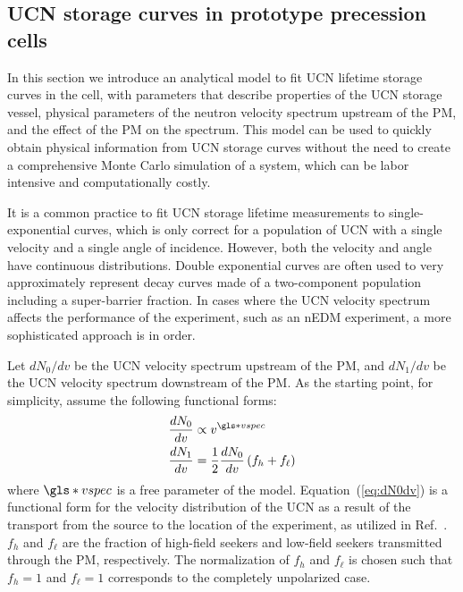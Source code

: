 
\subsection{\label{subsec:storageCurves}UCN storage curves in prototype precession cells}


In this section we introduce an analytical model to fit UCN lifetime storage curves in the cell, with parameters that describe properties of the UCN storage vessel, physical parameters of the neutron velocity spectrum upstream of the PM, and the effect of the PM on the spectrum. This model can be used to quickly obtain physical information from UCN storage curves without the need to create a comprehensive Monte Carlo simulation of a system, which can be labor intensive and computationally costly.

It is a common practice to fit UCN storage lifetime measurements to single-exponential curves, which is only correct for a population of UCN with a single velocity and a single angle of incidence. However, both the velocity and angle have continuous distributions. Double exponential curves are often used to very approximately represent decay curves made of a two-component population including a super-barrier fraction. In cases where the UCN velocity spectrum affects the performance of the experiment, such as an nEDM experiment, a more sophisticated approach is in order. 

Let $dN_0/dv$ be the UCN velocity spectrum upstream of the PM, and $dN_1/dv$ be the UCN velocity spectrum downstream of the PM. As the starting point, for simplicity, assume the following functional forms:
%
\begin{align}
    \frac{dN_0}{dv} &\propto v^{\gls*{vspec}}\label{eq:dN0dv}\\ 
    \frac{dN_1}{dv} &= \frac{1}{2} \frac{dN_0}{dv} \left( f_h + f_\ell \right)\label{eq:dN1dv_noBeta}
\end{align}
%
where $\gls*{vspec}$ is a free parameter of the model. Equation~(\ref{eq:dN0dv}) is a functional form for the velocity distribution of the UCN as a result of the transport from the source to the location of the experiment, as utilized in Ref.~\cite{ito_performance_2018}. $f_h$ and $f_\ell$ are the fraction of high-field seekers and low-field seekers transmitted through the PM, respectively. The normalization of $f_h$ and $f_\ell$ is chosen such that $f_h=1$ and $f_\ell=1$ corresponds to the completely unpolarized case.  

